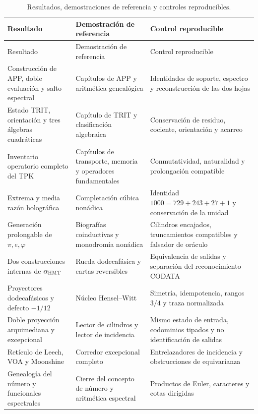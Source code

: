 \begingroup
\small
\setlength{\tabcolsep}{4pt}
\renewcommand{\arraystretch}{1.16}
\begin{longtable}{@{}>{\raggedright\arraybackslash}p{}
  >{\raggedright\arraybackslash}p{}
  >{\raggedright\arraybackslash}p{}@{}}
\caption{Resultados, demostraciones de referencia y controles reproducibles.}
\label{tab:indice-fuentes-acumulativo}\\
\toprule
Resultado & Demostración de referencia & Control reproducible\\
\midrule
\endfirsthead
\toprule
Resultado & Demostración de referencia & Control reproducible\\
\midrule
\endhead
Construcción de APP, doble evaluación y salto espectral
& Capítulos de APP y aritmética genealógica
& Identidades de soporte, espectro y reconstrucción de las dos hojas\\
Estado TRIT, orientación y tres álgebras cuadráticas
& Capítulo de TRIT y clasificación algebraica
& Conservación de residuo, cociente, orientación y acarreo\\
Inventario operatorio completo del TPK
& Capítulos de transporte, memoria y operadores fundamentales
& Conmutatividad, naturalidad y prolongación compatible\\
Extrema y media razón holográfica
& Completación cúbica nonádica
& Identidad $1000=729+243+27+1$ y conservación de la unidad\\
Generación prolongable de \(\pi,e,\varphi\)
& Biografías coinductivas y monodromía nonádica
& Cilindros encajados, truncamientos compatibles y falsador de oráculo\\
Dos construcciones internas de \(\alpha_{\rm HMT}\)
& Rueda dodecafásica y cartas reversibles
& Equivalencia de salidas y separación del reconocimiento CODATA\\
Proyectores dodecafásicos y defecto \(-1/12\)
& Núcleo Hensel--Witt
& Simetría, idempotencia, rangos $3/4$ y traza normalizada\\
Doble proyección arquimediana y excepcional
& Lector de cilindros y lector de incidencia
& Mismo estado de entrada, codominios tipados y no identificación de salidas\\
Retículo de Leech, VOA y Moonshine
& Corredor excepcional completo
& Entrelazadores de incidencia y obstrucciones de equivarianza\\
Genealogía del número y funcionales espectrales
& Cierre del concepto de número y aritmética espectral
& Productos de Euler, caracteres y cotas dirigidas\\

\end{longtable}
